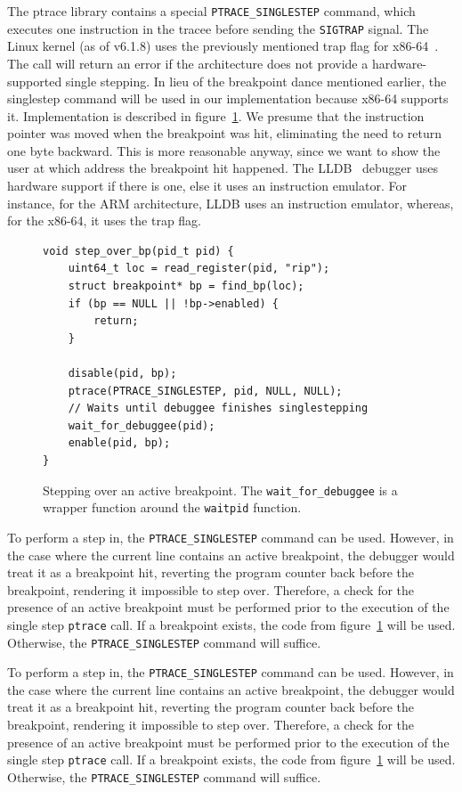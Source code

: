 The ptrace library contains a special \texttt{PTRACE\_SINGLESTEP} command,
which executes one instruction in the tracee before sending the
\texttt{SIGTRAP} signal. The Linux kernel (as of v6.1.8) uses the previously
mentioned trap flag for x86-64~\cite{linuxkernel-trapflag}. The call will
return an error if the architecture does not provide a hardware-supported
single stepping. In lieu of the breakpoint dance mentioned earlier, the
singlestep command will be used in our implementation because x86-64 supports
it. Implementation is described in figure~\ref{fig:singlestep}. We presume that
the instruction pointer was moved when the breakpoint was hit, eliminating the
need to return one byte backward. This is more reasonable anyway, since we want
to show the user at which address the breakpoint hit happened. The
LLDB~\cite{lldb} debugger uses hardware support if there is one, else it uses
an instruction emulator. For instance, for the ARM architecture, LLDB uses an
instruction emulator, whereas, for the x86-64, it uses the trap flag.

\begin{figure}
    \begin{verbatim}
void step_over_bp(pid_t pid) {
    uint64_t loc = read_register(pid, "rip");
    struct breakpoint* bp = find_bp(loc);
    if (bp == NULL || !bp->enabled) {
        return;
    }

    disable(pid, bp);
    ptrace(PTRACE_SINGLESTEP, pid, NULL, NULL);
    // Waits until debuggee finishes singlestepping
    wait_for_debuggee(pid);
    enable(pid, bp);
}
    \end{verbatim}
    \caption{Stepping over an active breakpoint. The \texttt{wait\_for\_debuggee}
    is a wrapper function around the \texttt{waitpid} function.}
    \label{fig:singlestep}
\end{figure}

To perform a step in, the \verb|PTRACE_SINGLESTEP| command can be used.
However, in the case where the current line contains an active breakpoint, the
debugger would treat it as a breakpoint hit, reverting the program counter back
before the breakpoint, rendering it impossible to step over. Therefore, a check
for the presence of an active breakpoint must be performed prior to the
execution of the single step \texttt{ptrace} call. If a breakpoint exists, the
code from figure~\ref{fig:singlestep} will be used. Otherwise, the
\verb|PTRACE_SINGLESTEP| command will suffice.

To perform a step in, the \verb|PTRACE_SINGLESTEP| command can be used.
However, in the case where the current line contains an active breakpoint, the
debugger would treat it as a breakpoint hit, reverting the program counter back
before the breakpoint, rendering it impossible to step over. Therefore, a check
for the presence of an active breakpoint must be performed prior to the
execution of the single step \texttt{ptrace} call. If a breakpoint exists, the
code from figure~\ref{fig:singlestep} will be used. Otherwise, the
\verb|PTRACE_SINGLESTEP| command will suffice.

